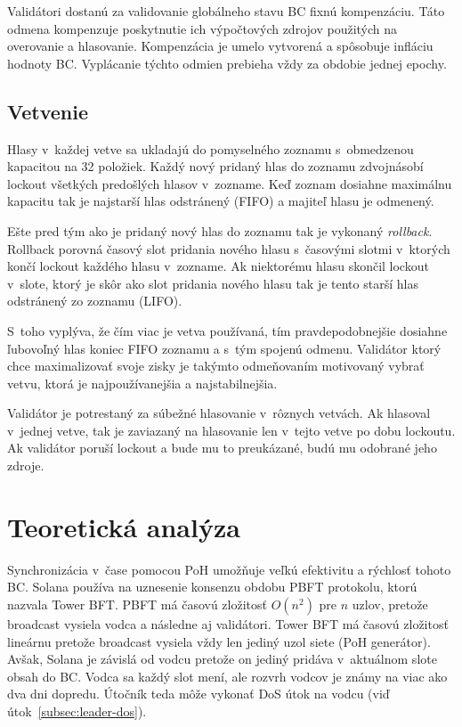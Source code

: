 Validátori dostanú za validovanie globálneho stavu BC fixnú kompenzáciu. Táto odmena kompenzuje poskytnutie ich výpočtových zdrojov použitých na overovanie a hlasovanie. Kompenzácia je umelo vytvorená a spôsobuje infláciu hodnoty BC. Vyplácanie týchto odmien prebieha vždy za obdobie jednej epochy.

\subsection{Vetvenie}\label{subsec:solana-branch}
Hlasy v~každej vetve sa ukladajú do pomyselného zoznamu s~obmedzenou kapacitou na 32 položiek. Každý nový pridaný hlas do zoznamu zdvojnásobí lockout všetkých predošlých hlasov v~zozname. Keď zoznam dosiahne maximálnu kapacitu tak je najstarší hlas odstránený (FIFO) a majiteľ hlasu je odmenený.

Ešte pred tým ako je pridaný nový hlas do zoznamu tak je vykonaný \textit{rollback}. Rollback porovná časový slot pridania nového hlasu s~časovými slotmi v~ktorých končí lockout každého hlasu v~zozname. Ak niektorému hlasu skončil lockout v~slote, ktorý je skôr ako slot pridania nového hlasu tak je tento starší hlas odstránený zo zoznamu (LIFO).

S~toho vyplýva, že čím viac je vetva používaná, tím pravdepodobnejšie dosiahne ľubovoľný hlas koniec FIFO zoznamu a s~tým spojenú odmenu. Validátor ktorý chce maximalizovať svoje zisky je takýmto odmeňovaním motivovaný vybrať vetvu, ktorá je najpoužívanejšia a najstabilnejšia.

Validátor je potrestaný za súbežné hlasovanie v~rôznych vetvách. Ak hlasoval v~jednej vetve, tak je zaviazaný na hlasovanie len v~tejto vetve po dobu lockoutu. Ak validátor poruší lockout a bude mu to preukázané, budú mu odobrané jeho zdroje.

\section{Teoretická analýza}\label{sec:solana-teor}

Synchronizácia v~čase pomocou PoH umožňuje veľkú efektivitu a rýchlosť tohoto BC. Solana používa na uznesenie konsenzu obdobu PBFT protokolu, ktorú nazvala Tower BFT. PBFT má časovú zložitosť $O(n^2)$ pre $n$ uzlov, pretože broadcast vysiela vodca a následne aj validátori. Tower BFT má časovú zložitosť lineárnu pretože broadcast vysiela vždy len jediný uzol siete (PoH generátor). Avšak, Solana je závislá od vodcu pretože on jediný pridáva v~aktuálnom slote obsah do BC. Vodca sa každý slot mení, ale rozvrh vodcov je známy na viac ako dva dni dopredu. Útočník teda môže vykonať DoS útok na vodcu (viď útok~\ref{subsec:leader-dos}).

